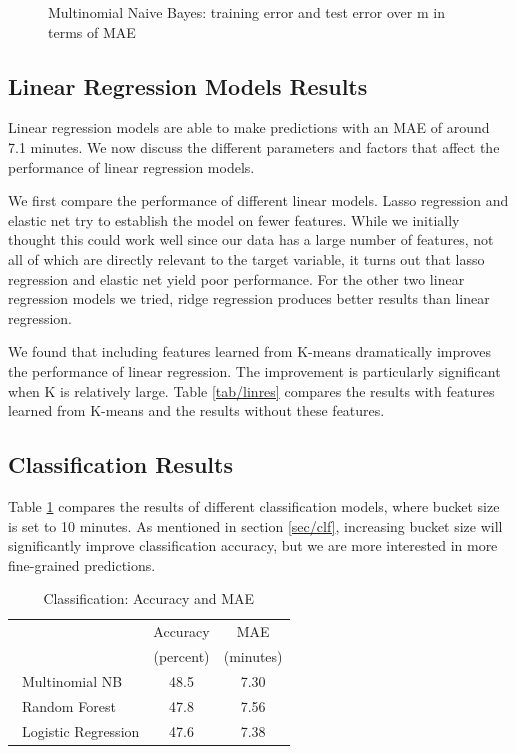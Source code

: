 \documentclass[english]{article}
\begin{document}
\begin{figure}[!htb]
  \caption{Multinomial Naive Bayes: training error and test error over m in terms of MAE}
\endminipage
\end{figure}

\subsection{Linear Regression Models Results}

Linear regression models are able to make predictions with an MAE of around 7.1 minutes. We now discuss the different parameters and factors that affect the performance of linear regression models.

We first compare the performance of different linear models.
Lasso regression and elastic net try to establish the model on fewer features. While we initially thought this could work well since our data has a large number of features, not all of which are directly relevant to the target variable, it turns out that lasso regression and elastic net yield poor performance.
For the other two linear regression models we tried, ridge regression produces better results than linear regression.

We found that including features learned from K-means dramatically improves the performance of linear regression. The improvement is particularly significant when K is relatively large. Table \ref{tab/linres} compares the results with features learned from K-means and the results without these features.

\subsection{Classification Results}

Table \ref{tab/clf} compares the results of different classification models, where bucket size is set to 10 minutes. As mentioned in section \ref{sec/clf}, increasing bucket size will significantly improve classification accuracy, but we are more interested in more fine-grained predictions.

\begin{table}[h]
\centering
  \begin{tabular}{|l|c|c|}
  \hline
  ~    & Accuracy & MAE \\
  ~    & (percent) & (minutes)  \\
  \hline
  \ Multinomial NB & 48.5                  & 7.30                        \\
  \hline
  \ Random Forest  & 47.8                   & 7.56                       \\
  \hline
  \ Logistic Regression  & 47.6                   & 7.38                       \\
  \hline
  \end{tabular}
\caption{Classification: Accuracy and MAE}
\label{tab/clf}
\end{table}
\end{document}
